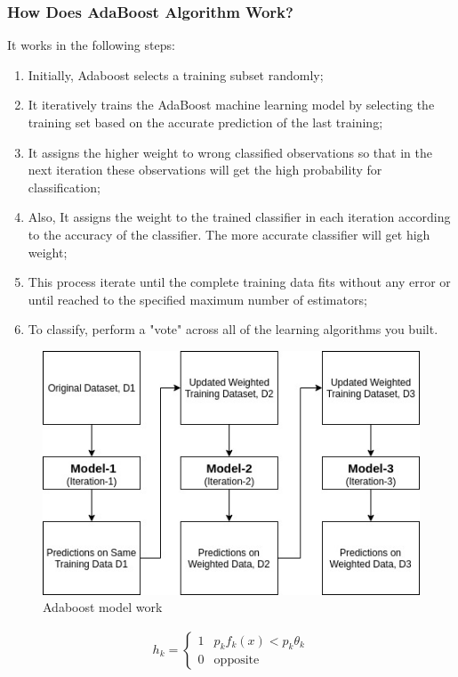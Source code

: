         \subsubsection{How Does AdaBoost Algorithm Work?}
            It works in the following steps:
            \begin{enumerate}
                \item Initially, Adaboost selects a training subset randomly;
                \item It iteratively trains the AdaBoost machine learning model by selecting the training set based on the accurate prediction of the last training;
                \item It assigns the higher weight to wrong classified observations so that in the next iteration these observations will get the high probability for classification;
                \item Also, It assigns the weight to the trained classifier in each iteration according to the accuracy of the classifier. The more accurate classifier will get high weight;
                \item This process iterate until the complete training data fits without any error or until reached to the specified maximum number of estimators;
                \item To classify, perform a "vote" across all of the learning algorithms you built.
            \end{enumerate}
            \begin{figure}[H]
                \centering
                \includegraphics[width=0.6\linewidth]{img/Adaboost work.png}
                \caption{Adaboost model work}
            \end{figure}
            \begin{align}
                h_k = \left\{
                    \begin{array}{ll}
                        1 & \mbox{$p_k f_k(x) < p_k \theta_k$} \\
                        0 & \mbox{opposite}
                    \end{array}
                \right.
            \end{align}
